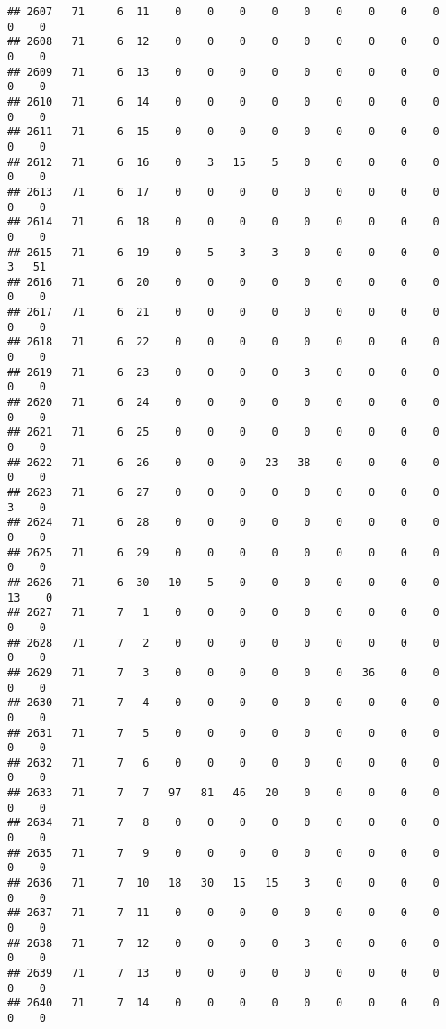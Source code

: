 \documentclass[]{article}
\begin{document}
\begin{verbatim}
## 2607   71     6  11    0    0    0    0    0    0    0    0    0    0    0
## 2608   71     6  12    0    0    0    0    0    0    0    0    0    0    0
## 2609   71     6  13    0    0    0    0    0    0    0    0    0    0    0
## 2610   71     6  14    0    0    0    0    0    0    0    0    0    0    0
## 2611   71     6  15    0    0    0    0    0    0    0    0    0    0    0
## 2612   71     6  16    0    3   15    5    0    0    0    0    0    0    0
## 2613   71     6  17    0    0    0    0    0    0    0    0    0    0    0
## 2614   71     6  18    0    0    0    0    0    0    0    0    0    0    0
## 2615   71     6  19    0    5    3    3    0    0    0    0    0    3   51
## 2616   71     6  20    0    0    0    0    0    0    0    0    0    0    0
## 2617   71     6  21    0    0    0    0    0    0    0    0    0    0    0
## 2618   71     6  22    0    0    0    0    0    0    0    0    0    0    0
## 2619   71     6  23    0    0    0    0    3    0    0    0    0    0    0
## 2620   71     6  24    0    0    0    0    0    0    0    0    0    0    0
## 2621   71     6  25    0    0    0    0    0    0    0    0    0    0    0
## 2622   71     6  26    0    0    0   23   38    0    0    0    0    0    0
## 2623   71     6  27    0    0    0    0    0    0    0    0    0    3    0
## 2624   71     6  28    0    0    0    0    0    0    0    0    0    0    0
## 2625   71     6  29    0    0    0    0    0    0    0    0    0    0    0
## 2626   71     6  30   10    5    0    0    0    0    0    0    0   13    0
## 2627   71     7   1    0    0    0    0    0    0    0    0    0    0    0
## 2628   71     7   2    0    0    0    0    0    0    0    0    0    0    0
## 2629   71     7   3    0    0    0    0    0    0   36    0    0    0    0
## 2630   71     7   4    0    0    0    0    0    0    0    0    0    0    0
## 2631   71     7   5    0    0    0    0    0    0    0    0    0    0    0
## 2632   71     7   6    0    0    0    0    0    0    0    0    0    0    0
## 2633   71     7   7   97   81   46   20    0    0    0    0    0    0    0
## 2634   71     7   8    0    0    0    0    0    0    0    0    0    0    0
## 2635   71     7   9    0    0    0    0    0    0    0    0    0    0    0
## 2636   71     7  10   18   30   15   15    3    0    0    0    0    0    0
## 2637   71     7  11    0    0    0    0    0    0    0    0    0    0    0
## 2638   71     7  12    0    0    0    0    3    0    0    0    0    0    0
## 2639   71     7  13    0    0    0    0    0    0    0    0    0    0    0
## 2640   71     7  14    0    0    0    0    0    0    0    0    0    0    0

\end{verbatim}
\end{document}
